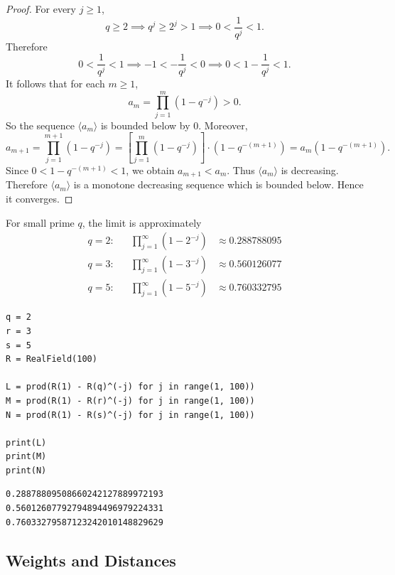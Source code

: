 \begin{proof}
	For every \(j\ge 1\),
	\[
	q\ge 2\implies q^j\ge 2^j>1\implies
	0<\frac{1}{q^j}<1.
	\]
	Therefore
	\[
	0<\frac{1}{q^j}<1\implies 
	-1<-\frac{1}{q^j}<0\implies 0<1-\frac{1}{q^j}<1.
	\]
	It follows that for each \(m\ge 1\),
	\[
	a_m=\prod_{j=1}^{m}(1-q^{-j})>0.
	\]
	So the sequence \(\langle a_m\rangle\) is bounded below by \(0\). Moreover,
	\[
	a_{m+1}
	=
	\prod_{j=1}^{m+1}(1-q^{-j})
	=
	\left[\prod_{j=1}^{m}(1-q^{-j})\right]\cdot(1-q^{-(m+1)})
	=
	a_m(1-q^{-(m+1)}).
	\]
	Since \(0<1-q^{-(m+1)}<1\), we obtain $
	a_{m+1}<a_m.$ Thus \(\langle a_m\rangle\) is decreasing. Therefore \(\langle a_m\rangle\) is a monotone decreasing sequence which is bounded below. Hence it converges.
\end{proof}
	
\medskip

\begin{example}
For small prime $q$, the limit is approximately \begin{align*}
q=2: && \prod_{j=1}^{\infty}(1-2^{-j})&\approx0.288788095\\
q=3: && \prod_{j=1}^{\infty}(1-3^{-j})&\approx0.560126077\\
q=5: && \prod_{j=1}^{\infty}(1-5^{-j})&\approx0.760332795
\end{align*}
\begin{center}
\begin{minipage}[t]{.62\textwidth}
\begin{lstlisting}[style=sagemath, numbers=none]
q = 2
r = 3
s = 5
R = RealField(100)

L = prod(R(1) - R(q)^(-j) for j in range(1, 100))
M = prod(R(1) - R(r)^(-j) for j in range(1, 100))
N = prod(R(1) - R(s)^(-j) for j in range(1, 100))

print(L)
print(M)
print(N)
\end{lstlisting}
\end{minipage}\hfill
\begin{minipage}[t]{.35\textwidth}
\begin{lstlisting}
0.28878809508660242127889972193
0.56012607792794894496979224331
0.76033279587123242010148829629
\end{lstlisting}
\end{minipage}
\end{center}
	\end{example}


\newpage
\subsection{Weights and Distances}






